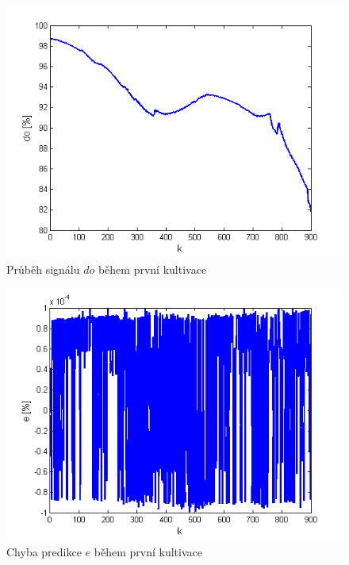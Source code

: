 \documentclass[11pt,twoside,openright]{report}
\begin{document}
\begin{appendices}
\begin{figure}
    \centering
    \includegraphics[scale=0.8]{IMG/artep/artep17_1.png}
    \caption{Průběh signálu $do$ během první kultivace}
    \label{fig:artep_1}
\end{figure}

\begin{figure}
    \centering
    \includegraphics[scale=0.8]{IMG/artep/artep17_3.png}
    \caption{Chyba predikce $e$ během první kultivace}
    \label{fig:artep_3}
\end{figure}


\end{appendices}
\end{document}
